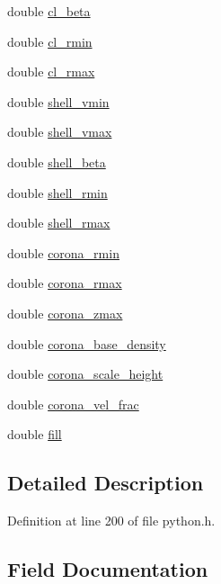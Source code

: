 \begin{DoxyCompactItemize}
\item 
double \hyperlink{structdomain_aead88414587817be3ccded2029cb3403}{cl\+\_\+beta}
\item 
double \hyperlink{structdomain_a32773e9268a422a59d6b7b9118d9e966}{cl\+\_\+rmin}
\item 
double \hyperlink{structdomain_a1aef3bdb197bf825b092b7c5e295ae0b}{cl\+\_\+rmax}
\item 
double \hyperlink{structdomain_a7f85fa84808d259d99df40cea538974b}{shell\+\_\+vmin}
\item 
double \hyperlink{structdomain_afe245787b302fa68acbaad6338a652f3}{shell\+\_\+vmax}
\item 
double \hyperlink{structdomain_a678c4aca9df82bcd2bdbba9a111e2683}{shell\+\_\+beta}
\item 
double \hyperlink{structdomain_abb11bd3034be69e7a6bb8673b2bf4f3b}{shell\+\_\+rmin}
\item 
double \hyperlink{structdomain_aaba4c028c0288f52e5b717abc3a8f5ec}{shell\+\_\+rmax}
\item 
double \hyperlink{structdomain_a56d32554e5192c52ea78672263130f67}{corona\+\_\+rmin}
\item 
double \hyperlink{structdomain_af45b1eba31feb6529fb11df5648e3bea}{corona\+\_\+rmax}
\item 
double \hyperlink{structdomain_aa07f5672067b05bf3608b27afe02b747}{corona\+\_\+zmax}
\item 
double \hyperlink{structdomain_a921857c057550470b8a5251e40470660}{corona\+\_\+base\+\_\+density}
\item 
double \hyperlink{structdomain_a59d1c3670b702d3804208dbd1926ad0e}{corona\+\_\+scale\+\_\+height}
\item 
double \hyperlink{structdomain_aa14bbb5f5941acc2a96db927c586f64e}{corona\+\_\+vel\+\_\+frac}
\item 
double \hyperlink{structdomain_af919432b7fbe13685cae0fcbc98f4e8f}{fill}
\end{DoxyCompactItemize}


\subsection{Detailed Description}


Definition at line 200 of file python.\+h.



\subsection{Field Documentation}
\mbox{\label{structdomain_aead88414587817be3ccded2029cb3403}} 
